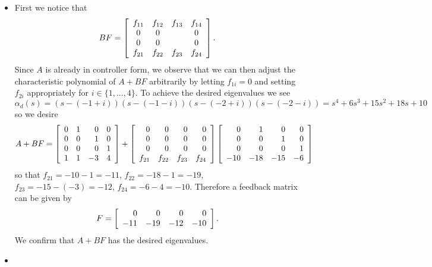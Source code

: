 \documentclass{article}
\begin{document}
\begin{itemize}
\item{
First we notice
that
$$
BF =
\left[\begin{array}{c c c c}
  f_{11} & f_{12} & f_{13} & f_{14} \\
  0     & 0     &       & 0      \\
  0     & 0     &       & 0      \\
  f_{21} & f_{22} & f_{23} & f_{24}
\end{array}\right].
$$
Since $A$ is already in controller form, we observe that we can then
adjust the characteristic polynomial of $A + BF$ arbitrarily by letting
$f_{1i} = 0$ and setting $f_{2i}$ appropriately for
$i \in \{ 1, \dots, 4 \}$. To achieve the desired eigenvalues we see
$$
\alpha_d(s) =
  (s - (-1 + i))
  (s - (-1 - i))
  (s - (-2 + i))
  (s - (-2 - i)) =
  s^4 + 6s^3 + 15s^2 + 18s + 10
$$
so we desire
$$
A + BF =
\left[\begin{array}{r r r r}
  0 & 1 &  0 & 0 \\
  0 & 0 &  1 & 0 \\
  0 & 0 &  0 & 1 \\
  1 & 1 & -3 & 4
\end{array}\right]
+
\left[\begin{array}{r r r r}
0     &     0 &     0 &     0 \\
0     &     0 &     0 &     0 \\
0     &     0 &     0 &     0 \\
f_{21} & f_{22} & f_{23} & f_{24}
\end{array}\right]
\left[\begin{array}{r r r r}
0   &   1 &   0 &  0 \\
0   &   0 &   1 &  0 \\
0   &   0 &   0 &  1 \\
-10 & -18 & -15 & -6
\end{array}\right]
$$
so that $f_{21} = -10 - 1 = -11$, $f_{22} = -18 - 1 = -19$,
$f_{23} = -15 - (-3) = -12$, $f_{24} = -6 - 4 = -10$. Therefore a feedback
matrix can be given by
$$
F =
\left[\begin{array}{r r r r}
   0   &   0 &   0 &   0 \\
   -11 & -19 & -12 & -10
\end{array}\right].
$$
We confirm that $A + BF$ has the desired eigenvalues.
}
\item
{
}
\end{itemize}

\pagebreak
\end{document}
